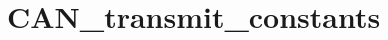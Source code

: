 \hypertarget{group___c_a_n__transmit__constants}{\section{C\-A\-N\-\_\-transmit\-\_\-constants}
\label{group___c_a_n__transmit__constants}
}

